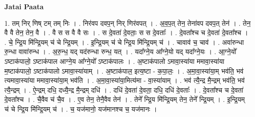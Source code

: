 \documentclass[17pt]{extarticle}
\begin{document}
\textbf{Jatai Paata} \newline

1. तम् निर् णिष् टम् तम् निः । . निर॑वप दवप॒न् निर् णिर॑वपत् । . अ॒व॒प॒त् तेन॒ तेना॑वप दवप॒त् तेन॑ । . तेन॒ वै वै तेन॒ तेन॒ वै । . वै स स वै वै सः । . स दे॒वता॑ दे॒वताः॒ स स दे॒वताः᳚ । . दे॒वता᳚श्च च दे॒वता॑ दे॒वता᳚श्च । . चे॒ न्द्रि॒य मि॑न्द्रि॒यम् च॑ चे न्द्रि॒यम् । . इ॒न्द्रि॒यम् च॑ चे न्द्रि॒य मि॑न्द्रि॒यम् च॑ । . चावाव॑ च॒ चाव॑ । . अवा॑रुन्धा रु॒न्धा वावा॑रुन्ध । . अ॒रु॒न्ध॒ यद् यद॑रुन्धा रुन्ध॒ यत् । . यदा᳚ग्ने॒य आ᳚ग्ने॒यो यद् यदा᳚ग्ने॒यः । . आ॒ग्ने॒यो᳚ ऽष्टाक॑पालो॒ ऽष्टाक॑पाल आग्ने॒य आ᳚ग्ने॒यो᳚ ऽष्टाक॑पालः । . अ॒ष्टाक॑पालो ऽमावा॒स्या॑या ममावा॒स्या॑या म॒ष्टाक॑पालो॒ ऽष्टाक॑पालो ऽमावा॒स्या॑याम् । . अ॒ष्टाक॑पाल॒ इत्य॒ष्टा - क॒पा॒लः॒ । . अ॒मा॒वा॒स्या॑या॒म् भव॑ति॒ भव॑ त्यमावा॒स्या॑या ममावा॒स्या॑या॒म् भव॑ति । . अ॒मा॒वा॒स्या॑या॒मित्य॑मा - वा॒स्या॑याम् । . भव॑ त्यै॒न्द्र मै॒न्द्रम् भव॑ति॒ भव॑ त्यै॒न्द्रम् । . ऐ॒न्द्रम् दधि॒ दध्यै॒न्द्र मै॒न्द्रम् दधि॑ । . दधि॑ दे॒वता॑ दे॒वता॒ दधि॒ दधि॑ दे॒वताः᳚ । . दे॒वता᳚श्च च दे॒वता॑ दे॒वता᳚श्च । . चै॒वैव च॑ चै॒व । . ए॒व तेन॒ तेनै॒वैव तेन॑ । . तेने᳚ न्द्रि॒य मि॑न्द्रि॒यम् तेन॒ तेने᳚ न्द्रि॒यम् । . इ॒न्द्रि॒यम् च॑ चे न्द्रि॒य मि॑न्द्रि॒यम् च॑ । . च॒ यज॑मानो॒ यज॑मानश्च च॒ यज॑मानः । \newline
\end{document}

